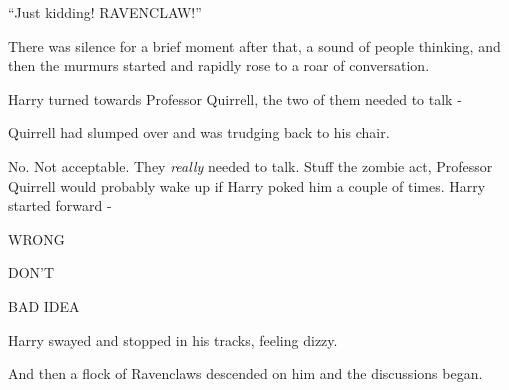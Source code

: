 ``Just kidding! RAVENCLAW!''

There was silence for a brief moment after that, a sound of people
thinking, and then the murmurs started and rapidly rose to a roar of
conversation.

Harry turned towards Professor Quirrell, the two of them needed to talk
-

Quirrell had slumped over and was trudging back to his chair.

No. Not acceptable. They \emph{really} needed to talk. Stuff the zombie
act, Professor Quirrell would probably wake up if Harry poked him a
couple of times. Harry started forward -

WRONG

DON'T

BAD IDEA

Harry swayed and stopped in his tracks, feeling dizzy.

And then a flock of Ravenclaws descended on him and the discussions
began.
